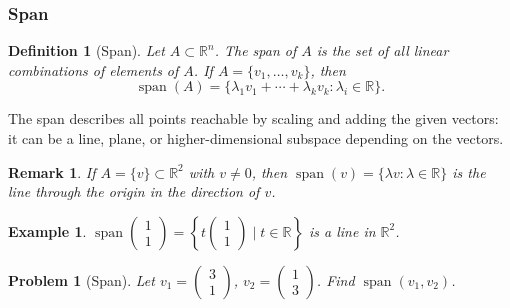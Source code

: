 \documentclass{article}
\newtheorem{definition}{Definition}
\newtheorem{problem}{Problem}
\newtheorem*{example}{Example}
\newtheorem{remark}{Remark}
\newcommand{\Span}{\operatorname{span}}
\begin{document}
\subsubsection{Span}
\begin{definition}[Span]
    Let $A \subset \mathbb{R}^n$. The span of $A$ is the set of all linear combinations of elements of $A$. If $A=\{v_1,\ldots,v_k\}$, then
    \[\Span(A) = \{\lambda_1 v_1+\cdots+\lambda_k v_k : \lambda_i \in \mathbb{R}\}.\]
\end{definition}
The span describes all points reachable by scaling and adding the given vectors: it can be a line, plane, or higher-dimensional subspace depending on the vectors.
\begin{remark}
    If $A=\{v\}\subset \mathbb{R}^2$ with $v\neq 0$, then $\Span(v) = \{\lambda v : \lambda \in \mathbb{R}\}$ is the line through the origin in the direction of $v$.
\end{remark}
\begin{example}
    $\Span\!\begin{pmatrix}1\\1\end{pmatrix} = \left\{t\begin{pmatrix}1\\1\end{pmatrix}\mid t \in \mathbb{R}\right\}$ is a line in $\mathbb{R}^2$.
\end{example}
\begin{problem}[Span]
    Let $v_1 = \begin{pmatrix}3\\1\end{pmatrix}$, $v_2 = \begin{pmatrix}1\\3\end{pmatrix}$. Find $\Span(v_1,v_2)$.
\end{problem}
\end{document}
